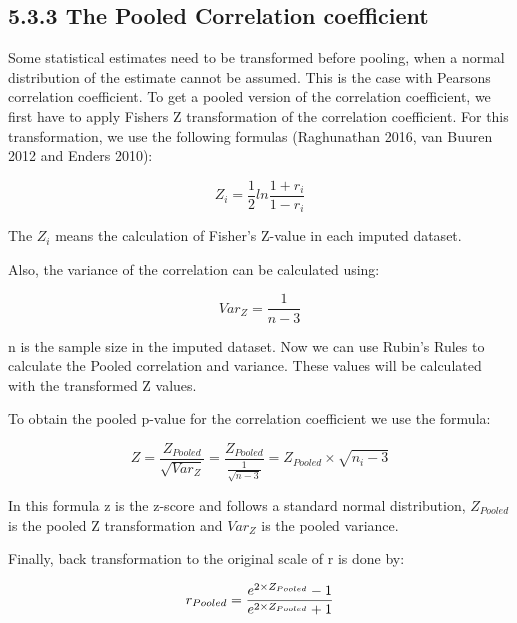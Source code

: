 \documentclass[]{book}
\theoremstyle{definition}
\theoremstyle{definition}
\theoremstyle{definition}
\theoremstyle{remark}
\begin{document}
\subsection{5.3.3 The Pooled Correlation
coefficient}\label{the-pooled-correlation-coefficient}

Some statistical estimates need to be transformed before pooling, when a
normal distribution of the estimate cannot be assumed. This is the case
with Pearsons correlation coefficient. To get a pooled version of the
correlation coefficient, we first have to apply Fishers Z transformation
of the correlation coefficient. For this transformation, we use the
following formulas (Raghunathan 2016, van Buuren 2012 and Enders 2010):

\begin{equation}
Z_i = \frac{1}{2}ln\frac{1+r_i}{1-r_i}
  \label{eq:cor}
\end{equation}

The \({Z_i}\) means the calculation of Fisher's Z-value in each imputed
dataset.

Also, the variance of the correlation can be calculated using:

\begin{equation}
Var_Z=\frac{1}{n-3}
  \label{eq:var-cor}
\end{equation}

n is the sample size in the imputed dataset. Now we can use Rubin's
Rules to calculate the Pooled correlation and variance. These values
will be calculated with the transformed Z values.

To obtain the pooled p-value for the correlation coefficient we use the
formula:

\begin{equation}
Z=\frac{Z_{Pooled}}{\sqrt{Var_Z}} = \frac{Z_{Pooled}}{\frac{1}{\sqrt{n-3}}}=Z_{Pooled}\times\sqrt{n_i-3}
  \label{eq:z-cor}
\end{equation}

In this formula z is the z-score and follows a standard normal
distribution, \(Z_{Pooled}\) is the pooled Z transformation and
\(Var_Z\) is the pooled variance.

Finally, back transformation to the original scale of r is done by:

\begin{equation}
r_{Pooled} = \frac{e^{2\times\\Z_{Pooled}}-1}{e^{2\times\\Z_{Pooled}}+1}
  \label{eq:exp-cor}
\end{equation}
\end{document}
